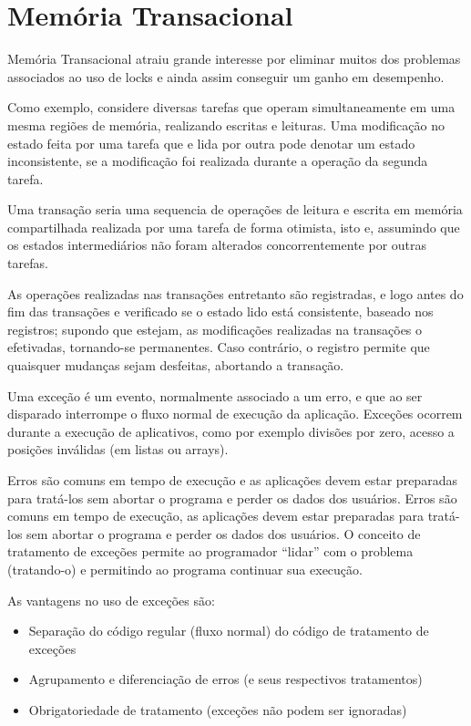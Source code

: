 \section{Memória Transacional}

Memória Transacional atraiu
 grande interesse por eliminar muitos dos problemas associados ao uso de locks
 e ainda assim conseguir um ganho em desempenho.


Como exemplo, considere diversas tarefas que operam simultaneamente em uma mesma regiões de memória, realizando escritas e leituras. Uma modificação no estado feita por uma tarefa que e lida por outra pode denotar um estado inconsistente, se a modificação foi realizada durante a operação da segunda tarefa.

Uma transação seria uma sequencia de operações de leitura e escrita em memória compartilhada realizada por uma tarefa de forma otimista, isto e, assumindo que os estados intermediários não foram alterados
 concorrentemente por outras tarefas.


As operações realizadas nas transações entretanto são registradas, e logo antes do fim das transações e verificado se o estado lido está consistente, baseado nos registros; supondo que estejam, as modificações realizadas na transações o efetivadas, tornando-se permanentes. Caso contrário, o registro permite que quaisquer mudanças sejam desfeitas, abortando a transação.



Uma exceção é um evento, normalmente associado a um erro, e que ao ser disparado interrompe o fluxo normal de execução da aplicação. Exceções ocorrem durante a execução de aplicativos, como por exemplo divisões por zero, acesso a posições inválidas (em listas ou arrays).


Erros são comuns em tempo de execução e as aplicações devem estar preparadas para tratá-los sem abortar o programa e perder os dados dos usuários. Erros são comuns em tempo de execução, as aplicações devem estar preparadas para tratá-los sem abortar o programa e perder os dados dos usuários. O conceito de tratamento de exceções permite ao programador ``lidar'' com o problema (tratando-o) e permitindo ao programa continuar sua execução.

As vantagens no uso de exceções são: 

\begin{itemize}
\item Separação do código regular (fluxo normal) do código de tratamento de exceções
\item Agrupamento e diferenciação de erros (e seus respectivos tratamentos)
\item Obrigatoriedade de tratamento (exceções não podem ser ignoradas)
\end{itemize}


